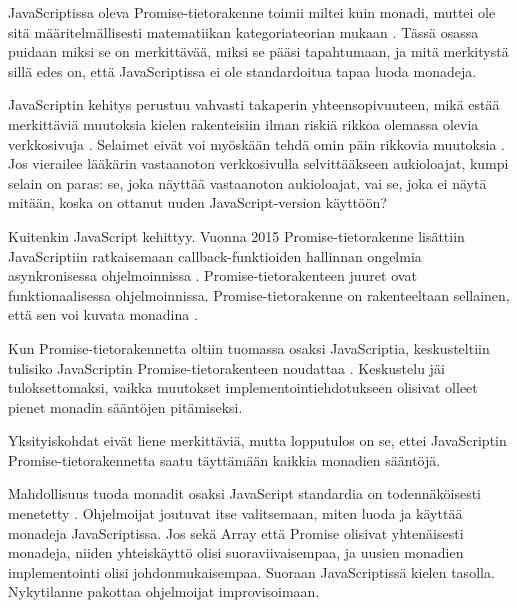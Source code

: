JavaScriptissa oleva Promise-tietorakenne toimii miltei kuin monadi, muttei ole sitä määritelmällisesti matematiikan kategoriateorian mukaan \cite{stackoverflow:why_monad,promises-spec-94}. Tässä osassa puidaan miksi se on merkittävää, miksi se pääsi tapahtumaan, ja mitä merkitystä sillä edes on, että JavaScriptissa ei ole standardoitua tapaa luoda monadeja.

JavaScriptin kehitys perustuu vahvasti takaperin yhteensopivuuteen, mikä estää merkittäviä muutoksia kielen rakenteisiin ilman riskiä rikkoa olemassa olevia verkkosivuja \cite{prototype_library_trends}. Selaimet eivät voi myöskään tehdä omin päin rikkovia muutoksia \cite{against_self_closing_tags,proposal-joint-iteration}. Jos vierailee lääkärin vastaanoton verkkosivulla selvittääkseen aukioloajat, kumpi selain on paras: se, joka näyttää vastaanoton aukioloajat, vai se, joka ei näytä mitään, koska on ottanut uuden JavaScript-version käyttöön?

Kuitenkin JavaScript kehittyy. Vuonna 2015 Promise-tietorakenne lisättiin JavaScriptiin ratkaisemaan callback-funktioiden hallinnan ongelmia asynkronisessa ohjelmoinnissa \cite{mdn_promise,callbackhell}. Promise-tietorakenteen juuret ovat funktionaalisessa ohjelmoinnissa. Promise-tietorakenne on rakenteeltaan sellainen, että sen voi kuvata monadina \cite{promises-spec-94,stackoverflow:why_monad}.

Kun Promise-tietorakennetta oltiin tuomassa osaksi JavaScriptia, keskusteltiin tulisiko JavaScriptin Promise-tietorakenteen noudattaa  \cite{promises-spec-94}. Keskustelu jäi tuloksettomaksi, vaikka muutokset implementointiehdotukseen olisivat olleet pienet monadin sääntöjen pitämiseksi.

Yksityiskohdat eivät liene merkittäviä, mutta lopputulos on se, ettei JavaScriptin Promise-tietorakennetta saatu täyttämään kaikkia monadien sääntöjä.

Mahdollisuus tuoda monadit osaksi JavaScript standardia on todennäköisesti menetetty \cite{proposal-joint-iteration,prototype_library_trends}. Ohjelmoijat joutuvat itse valitsemaan, miten luoda ja käyttää monadeja JavaScriptissa. Jos sekä Array että Promise olisivat yhtenäisesti monadeja, niiden yhteiskäyttö olisi suoraviivaisempaa, ja uusien monadien implementointi olisi johdonmukaisempaa. Suoraan JavaScriptissä kielen tasolla. Nykytilanne pakottaa ohjelmoijat improvisoimaan.